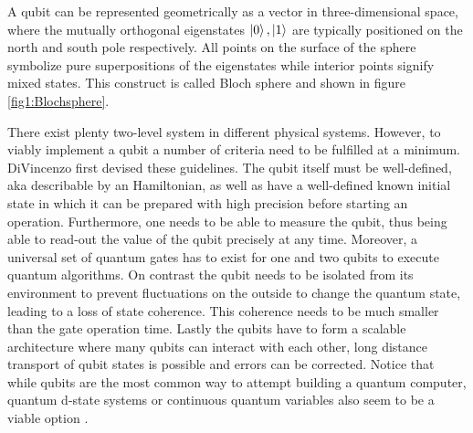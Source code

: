 A qubit can be represented geometrically as a vector in three-dimensional space, where the mutually orthogonal eigenstates $\ket{0},\ket{1}$ are typically positioned on the north and south pole respectively. All points on the surface of the sphere symbolize pure superpositions of the eigenstates while interior points signify mixed states. This construct is called Bloch sphere and shown in figure \ref{fig1:Blochsphere}. 

There exist plenty two-level system in different physical systems. However, to viably implement a qubit a number of criteria need to be fulfilled at a minimum. DiVincenzo first devised  these guidelines. \cite{DiVincenzocriteria} 
The qubit itself must be well-defined, aka describable by an Hamiltonian, as well as have a well-defined known initial state in which it can be prepared with high precision before starting an operation. Furthermore, one needs to be able to measure the qubit, thus being able to read-out the value of the qubit precisely at any time. Moreover, a universal set of quantum gates has to exist for one and two qubits to execute quantum algorithms. On contrast the qubit needs to be isolated from its environment to prevent fluctuations on the outside to change the quantum state, leading to a loss of state coherence. This coherence needs to be much smaller than the gate operation time.  Lastly the qubits have to form a scalable architecture where many qubits can interact with each other, long distance transport of qubit states is possible and errors can be corrected.
Notice that while qubits are the most common way to attempt building a quantum computer, quantum d-state systems or continuous quantum variables also seem to be a viable option \cite{Ladd2010}. 
 

